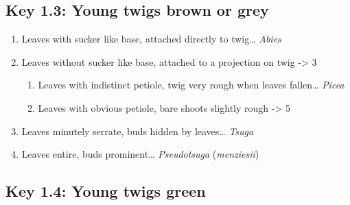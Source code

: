 \documentclass[openany]{book}
\providecommand{\tightlist}{%
  \setlength{\itemsep}{0pt}\setlength{\parskip}{0pt}}
\begin{document}
\hypertarget{key-1.3-young-twigs-brown-or-grey}{%
\subsection*{Key 1.3: Young twigs brown or grey}\label{key-1.3-young-twigs-brown-or-grey}}

\begin{enumerate}
\def\labelenumi{\arabic{enumi}.}
\tightlist
\item
  Leaves with sucker like base, attached directly to twig\ldots{} \emph{Abies}
\item
  Leaves without sucker like base, attached to a projection on twig -\textgreater{} 3

  \begin{enumerate}
  \def\labelenumii{\arabic{enumii}.}
  \setcounter{enumii}{2}
  \tightlist
  \item
    Leaves with indistinct petiole, twig very rough when leaves fallen\ldots{} \emph{Picea}
  \item
    Leaves with obvious petiole, bare shoots slightly rough -\textgreater{} 5
  \end{enumerate}
\item
  Leaves minutely serrate, buds hidden by leaves\ldots{} \emph{Tsuga}
\item
  Leaves entire, buds prominent\ldots{} \emph{Pseudotsuga} (\emph{menziesii})
\end{enumerate}

\hypertarget{key-1.4-young-twigs-green}{%
\subsection*{Key 1.4: Young twigs green}\label{key-1.4-young-twigs-green}}
\end{document}
